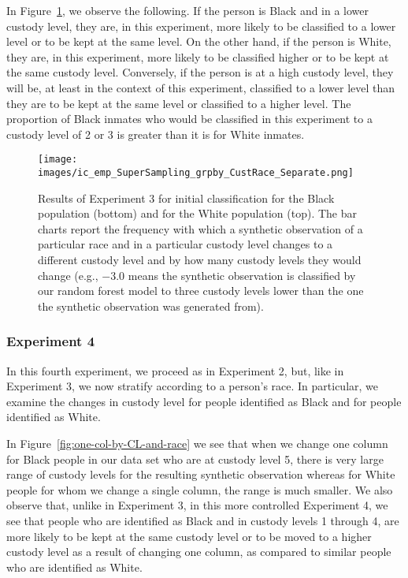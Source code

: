 \documentclass{amsproc}
\numberwithin{equation}{section}
\theoremstyle{plain}
\theoremstyle{remark}
\begin{document}
In Figure~\ref{fig:emp-by-CL-and-race}, we observe the following.  If the person is Black and in a lower custody level, they are, in this experiment, more likely to be classified to a lower level or to be kept at the same level.  On the other hand, if the person is White, they are, in this experiment, more likely to be classified higher or to be kept at the same custody level.  Conversely, if the person is at a high custody level, they will be, at least in the context of this experiment, classified to a lower level than they are to be kept at the same level or classified to a higher level.  The proportion of Black inmates who would be classified in this experiment to a custody level of 2 or 3 is greater than it is for White inmates.

\begin{figure}
\centering
\texttt{[image: images/ic\_emp\_SuperSampling\_grpby\_CustRace\_Separate.png]}

\caption{Results of Experiment 3 for initial classification for the Black population (bottom) and for the White population (top).  The bar charts report the frequency with which a synthetic observation of a particular race and in a particular custody level changes to a different custody level and by how many custody levels they would change (e.g., $-3.0$ means the synthetic observation is classified by our random forest model to three custody levels lower than the one the synthetic observation was generated from).}\label{fig:emp-by-CL-and-race}
\end{figure}




\subsubsection{Experiment 4} In this fourth experiment, we proceed as in Experiment 2, but, like in Experiment 3, we now stratify according to a person's race.  In particular, we examine the changes in custody level for people identified as Black and for people identified as White.  

In Figure~\ref{fig:one-col-by-CL-and-race} we see that when we change one column for Black people in our data set who are at custody level 5, there is very large range of custody levels for the resulting synthetic observation whereas for White people for whom we change a single column, the range is much smaller.  We also observe that, unlike in Experiment 3, in this more controlled Experiment 4, we see that people who are identified as Black and in custody levels 1 through 4, are more likely to be kept at the same custody level or to be moved to a higher custody level as a result of changing one column, as compared to similar people who are identified as White.
\end{document}
